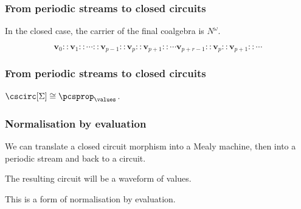 \begin{frame}
    \frametitle{From periodic streams to closed circuits}

    In the \alert{closed} case, the carrier of the final coalgebra is \(N^\omega\).

    \pause

    \[ \textbf{v}_0 :: \textbf{v}_1 :: \cdots :: \textbf{v}_{p-1} :: \textbf{v}_{p} :: \textbf{v}_{p+1} :: \cdots \textbf{v}_{p+r-1} :: \textbf{v}_{p} :: \textbf{v}_{p+1} :: \cdots\]

    \pause

    \begin{center}
    \end{center}

\end{frame}

\begin{frame}
    \frametitle{From periodic streams to closed circuits}
        \pause

        \begin{center}

            \pause

            \vspace{1em}

        \end{center}
    
        \vspace{1em}

        \pause

        \begin{theorem}
            \(\cscirc[\Sigma] \cong {\pcsprop}_{\values}\).
        \end{theorem}
\end{frame}

\begin{frame}
    \frametitle{Normalisation by evaluation}

    \pause

    We can translate a closed circuit morphism into a Mealy machine, then into a periodic stream and back to a circuit.

    \pause

    The resulting circuit will be a \alert{waveform} of values.
    
    \pause

    This is a form of \alert{normalisation by evaluation}.

\end{frame}